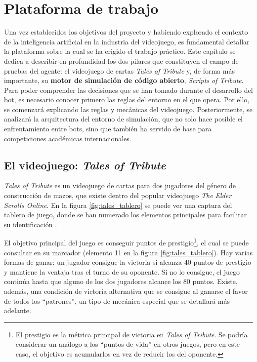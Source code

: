 \chapter{Plataforma de trabajo} \label{chap:plataforma_trabajo}

Una vez establecidos los objetivos del proyecto y habiendo explorado el contexto de la inteligencia artificial en la industria del videojuego, es fundamental detallar la plataforma sobre la cual se ha erigido el trabajo práctico. Este capítulo se dedica a describir en profundidad los dos pilares que constituyen el campo de pruebas del agente: el videojuego de cartas \textit{Tales of Tribute} y, de forma más importante, su \textbf{motor de simulación de código abierto}, \textit{Scripts of Tribute}. Para poder comprender las decisiones que se han tomado durante el desarrollo del bot, es necesario conocer primero las reglas del entorno en el que opera. Por ello, se comenzará explicando las reglas y mecánicas del videojuego. Posteriormente, se analizará la arquitectura del entorno de simulación, que no solo hace posible el enfrentamiento entre bots, sino que también ha servido de base para competiciones académicas internacionales.


\section{El videojuego: \textit{Tales of Tribute}} \label{sec:tales_of_tribute}

\textit{Tales of Tribute} es un videojuego de cartas para dos jugadores del género de construcción de mazos, que existe dentro del popular videojuego \textit{The Elder Scrolls Online}. En la figura \ref{fig:tales_tablero} se puede ver una captura del tablero de juego, donde se han numerado los elementos principales para facilitar su identificación \cite{pixel_eso_2022}.

El objetivo principal del juego es conseguir puntos de prestigio\footnote{El prestigio es la métrica principal de victoria en \textit{Tales of Tribute}. Se podría considerar un análogo a los ``puntos de vida'' en otros juegos, pero en este caso, el objetivo es acumularlos en vez de reducir los del oponente.}, el cual se puede consultar en su marcador (elemento 11 en la figura \ref{fig:tales_tablero}). Hay varias formas de ganar: un jugador consigue la victoria si alcanza 40 puntos de prestigio y mantiene la ventaja tras el turno de su oponente. Si no lo consigue, el juego continúa hasta que alguno de los dos jugadores alcance los 80 puntos. Existe, además, una condición de victoria alternativa que se consigue al ganarse el favor de todos los ``patrones'', un tipo de mecánica especial que se detallará más adelante.

